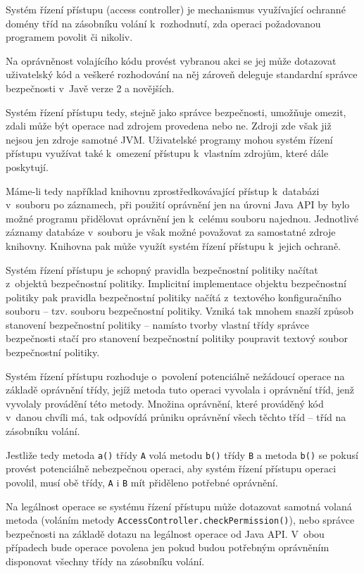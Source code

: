 Systém řízení přístupu (access controller) je mechanismus využívající ochranné domény tříd na zásobníku volání k~rozhodnutí, zda operaci požadovanou programem povolit či nikoliv.

Na oprávněnost volajícího kódu provést vybranou akci se jej může dotazovat uživatelský kód a veškeré rozhodování na něj zároveň deleguje standardní správce bezpečnosti v~Javě verze 2 a novějších.~\cite{oaks}

Systém řízení přístupu tedy, stejně jako správce bezpečnosti, umožňuje omezit, zdali může být operace nad zdrojem provedena nebo ne. Zdroji zde však již nejsou jen zdroje samotné JVM. Uživatelské programy mohou systém řízení přístupu využívat také k~omezení přístupu k~vlastním zdrojům, které dále poskytují.~\cite{oaks}

Máme-li tedy například knihovnu zprostředkovávající přístup k~databázi v~souboru po záznamech, při použití oprávnění jen na úrovni Java API by bylo možné programu přidělovat oprávnění jen k~celému souboru najednou. Jednotlivé záznamy databáze v~souboru je však možné považovat za samostatné zdroje knihovny. Knihovna pak může využít systém řízení přístupu k~jejich ochraně.

Systém řízení přístupu je schopný pravidla bezpečnostní politiky načítat z~objektů bezpečnostní politiky.
Implicitní implementace objektu bezpečnostní politiky pak pravidla bezpečnostní politiky načítá z~textového konfiguračního souboru -- tzv. souboru bezpečnostní politiky.
Vzniká tak mnohem snazší způsob stanovení bezpečnostní politiky -- namísto tvorby vlastní třídy správce bezpečnosti stačí pro stanovení bezpečnostní politiky poupravit textový soubor bezpečnostní politiky.~\cite{oaks}

Systém řízení přístupu rozhoduje o~povolení potenciálně nežádoucí operace na základě oprávnění třídy, jejíž metoda tuto operaci vyvolala i oprávnění tříd,
jenž vyvolaly provádění této metody.
Množina oprávnění, které prováděný kód v~danou chvíli má, tak odpovídá průniku oprávnění všech těchto tříd -- tříd na zásobníku volání.

Jestliže tedy metoda {\tt a()} třídy {\tt A} volá metodu {\tt b()} třídy {\tt B} a metoda {\tt b()} se pokusí provést potenciálně nebezpečnou operaci,
aby systém řízení přístupu operaci povolil, musí obě třídy, {\tt A} i {\tt B} mít přiděleno potřebné oprávnění.

Na legálnost operace se systému řízení přístupu může dotazovat samotná volaná metoda (voláním metody {\tt AccessController.checkPermission()}), nebo správce bezpečnosti na základě dotazu na legálnost operace od Java API. V~obou případech bude operace povolena jen pokud budou potřebným oprávněním disponovat všechny třídy na zásobníku volání.


